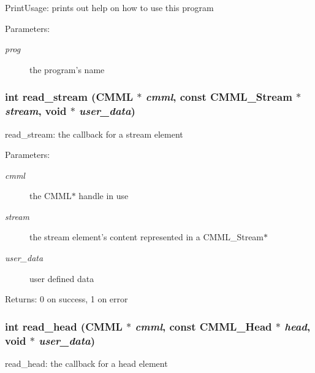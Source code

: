 Print\-Usage: prints out help on how to use this program

\begin{Desc}
\item[Parameters:]
\begin{description}
\item[{\em prog}]the program's name \end{description}
\end{Desc}
\subsubsection{\setlength{\rightskip}{0pt plus 5cm}int read\_\-stream ({\bf CMML} $\ast$ {\em cmml}, const {\bf CMML\_\-Stream} $\ast$ {\em stream}, void $\ast$ {\em user\_\-data})\hspace{0.3cm}{\tt  [static]}}\label{cmml-fix_8c_a3}


read\_\-stream: the callback for a stream element

\begin{Desc}
\item[Parameters:]
\begin{description}
\item[{\em cmml}]the CMML$\ast$ handle in use \item[{\em stream}]the stream element's content represented in a CMML\_\-Stream$\ast$ \item[{\em user\_\-data}]user defined data\end{description}
\end{Desc}
\begin{Desc}
\item[Returns:]0 on success, 1 on error \end{Desc}
\subsubsection{\setlength{\rightskip}{0pt plus 5cm}int read\_\-head ({\bf CMML} $\ast$ {\em cmml}, const {\bf CMML\_\-Head} $\ast$ {\em head}, void $\ast$ {\em user\_\-data})\hspace{0.3cm}{\tt  [static]}}\label{cmml-fix_8c_a4}


read\_\-head: the callback for a head element

